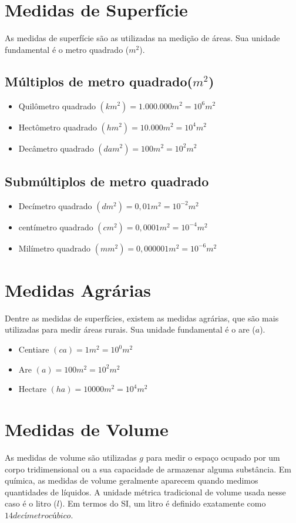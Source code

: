 \section{Medidas de Superfície}
As medidas de superfície são as utilizadas na medição de
áreas. Sua unidade fundamental é o metro quadrado ($m^2$).
    \subsection{Múltiplos de metro quadrado($m^2$)}
		\begin{itemize}
			\item Quilômetro quadrado $(km^2) = 1.000.000 m^2 = 10^6 m^2$
			\item Hectômetro quadrado $(hm^2) = 10.000 m^2 = 10^4 m^2$
			\item Decâmetro quadrado $(dam^2) = 100 m^2 = 10^2 m^2$
		\end{itemize}

	\subsection{Submúltiplos de metro quadrado}
		\begin{itemize}
			\item Decímetro quadrado $(dm^2) = 0,01m^2 = 10^{-2}m^2$
			\item centímetro quadrado $(cm^2) = 0,0001m^2 = 10^{-4}m^2$
			\item Milímetro quadrado $(mm^2)= 0,000001m^2 = 10^{-6}m^2$
		\end{itemize}

\section{Medidas Agrárias}
Dentre as medidas de superfícies, existem as medidas
agrárias, que são mais utilizadas para medir áreas rurais. Sua
unidade fundamental é o are ($a$).
	\begin{itemize}
		\item Centiare $(ca) = 1m^{2}=10^{0}m^{2}$
		\item Are $(a)= 100m^{2} = 10^{2}m^{2}$
		\item Hectare $(ha) = 10000m^{2} = 10^{4}m^{2}$
	\end{itemize}

\section{Medidas de Volume} 
As medidas de volume são utilizadas $g$ para medir o espaço ocupado por um corpo tridimensional ou a sua capacidade de armazenar alguma
substância. Em química, as medidas de volume geralmente aparecem quando medimos quantidades de líquidos. A unidade métrica tradicional de volume usada nesse caso é o litro ($l$). Em termos
do SI, um litro é definido exatamente como $14 decímetro cúbico$.

